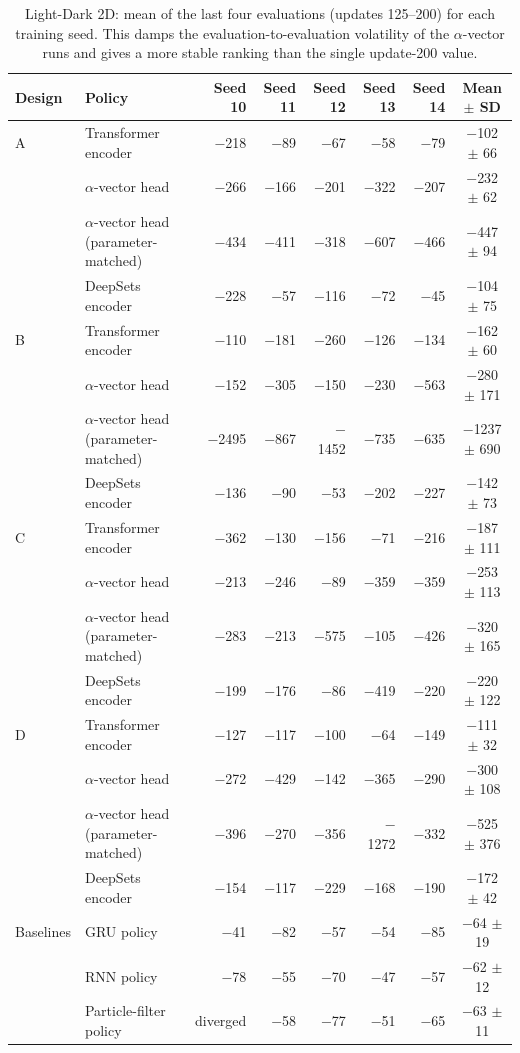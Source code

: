 \documentclass[11pt]{article}
\begin{document}
\begin{table}[htbp]
\centering
\footnotesize
\caption{Light-Dark 2D: mean of the last four evaluations (updates 125--200) for each training seed. This damps the evaluation-to-evaluation volatility of the $\alpha$-vector runs and gives a more stable ranking than the single update-200 value.}
\label{tab:ld2d-tail4}
\begin{tabular}{llrrrrrc}
\toprule
Design & Policy & Seed 10 & Seed 11 & Seed 12 & Seed 13 & Seed 14 & Mean $\pm$ SD \\
\midrule
A & Transformer encoder & $-$218 & $-$89 & $-$67 & $-$58 & $-$79 & $-$102 $\pm$ 66 \\
 & $\alpha$-vector head & $-$266 & $-$166 & $-$201 & $-$322 & $-$207 & $-$232 $\pm$ 62 \\
 & $\alpha$-vector head (parameter-matched) & $-$434 & $-$411 & $-$318 & $-$607 & $-$466 & $-$447 $\pm$ 94 \\
 & DeepSets encoder & $-$228 & $-$57 & $-$116 & $-$72 & $-$45 & $-$104 $\pm$ 75 \\
\midrule
B & Transformer encoder & $-$110 & $-$181 & $-$260 & $-$126 & $-$134 & $-$162 $\pm$ 60 \\
 & $\alpha$-vector head & $-$152 & $-$305 & $-$150 & $-$230 & $-$563 & $-$280 $\pm$ 171 \\
 & $\alpha$-vector head (parameter-matched) & $-$2495 & $-$867 & $-$1452 & $-$735 & $-$635 & $-$1237 $\pm$ 690 \\
 & DeepSets encoder & $-$136 & $-$90 & $-$53 & $-$202 & $-$227 & $-$142 $\pm$ 73 \\
\midrule
C & Transformer encoder & $-$362 & $-$130 & $-$156 & $-$71 & $-$216 & $-$187 $\pm$ 111 \\
 & $\alpha$-vector head & $-$213 & $-$246 & $-$89 & $-$359 & $-$359 & $-$253 $\pm$ 113 \\
 & $\alpha$-vector head (parameter-matched) & $-$283 & $-$213 & $-$575 & $-$105 & $-$426 & $-$320 $\pm$ 165 \\
 & DeepSets encoder & $-$199 & $-$176 & $-$86 & $-$419 & $-$220 & $-$220 $\pm$ 122 \\
\midrule
D & Transformer encoder & $-$127 & $-$117 & $-$100 & $-$64 & $-$149 & $-$111 $\pm$ 32 \\
 & $\alpha$-vector head & $-$272 & $-$429 & $-$142 & $-$365 & $-$290 & $-$300 $\pm$ 108 \\
 & $\alpha$-vector head (parameter-matched) & $-$396 & $-$270 & $-$356 & $-$1272 & $-$332 & $-$525 $\pm$ 376 \\
 & DeepSets encoder & $-$154 & $-$117 & $-$229 & $-$168 & $-$190 & $-$172 $\pm$ 42 \\
\midrule
Baselines & GRU policy & $-$41 & $-$82 & $-$57 & $-$54 & $-$85 & $-$64 $\pm$ 19 \\
 & RNN policy & $-$78 & $-$55 & $-$70 & $-$47 & $-$57 & $-$62 $\pm$ 12 \\
 & Particle-filter policy & diverged & $-$58 & $-$77 & $-$51 & $-$65 & $-$63 $\pm$ 11 \\
\bottomrule
\end{tabular}
\end{table}
\end{document}
